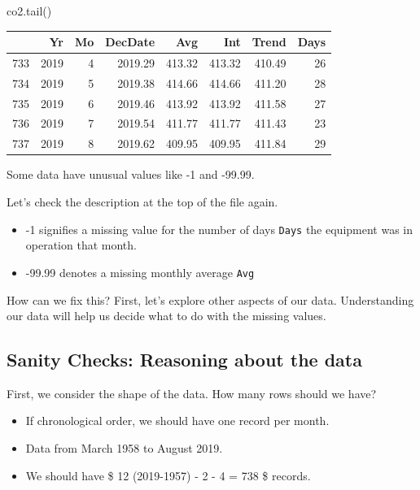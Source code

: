 \documentclass[
  letterpaper,
  DIV=11,
  numbers=noendperiod]{scrreprt}
\newenvironment{Shaded}{\begin{snugshade}}{\end{snugshade}}
\newcommand{\NormalTok}[1]{\textcolor[rgb]{0.00,0.23,0.31}{#1}}
\providecommand{\tightlist}{%
  \setlength{\itemsep}{0pt}\setlength{\parskip}{0pt}}\usepackage{longtable,booktabs,array}
\begin{document}
\begin{Shaded}
\begin{Highlighting}[]
\NormalTok{co2.tail()}
\end{Highlighting}
\end{Shaded}

\begin{tabular}{lrrrrrrr}
\toprule
{} &    Yr &  Mo &  DecDate &    Avg &    Int &  Trend &  Days \\
\midrule
733 &  2019 &   4 &  2019.29 & 413.32 & 413.32 & 410.49 &    26 \\
734 &  2019 &   5 &  2019.38 & 414.66 & 414.66 & 411.20 &    28 \\
735 &  2019 &   6 &  2019.46 & 413.92 & 413.92 & 411.58 &    27 \\
736 &  2019 &   7 &  2019.54 & 411.77 & 411.77 & 411.43 &    23 \\
737 &  2019 &   8 &  2019.62 & 409.95 & 409.95 & 411.84 &    29 \\
\bottomrule
\end{tabular}

Some data have unusual values like -1 and -99.99.

Let's check the description at the top of the file again.

\begin{itemize}
\tightlist
\item
  -1 signifies a missing value for the number of days \texttt{Days} the
  equipment was in operation that month.
\item
  -99.99 denotes a missing monthly average \texttt{Avg}
\end{itemize}

How can we fix this? First, let's explore other aspects of our data.
Understanding our data will help us decide what to do with the missing
values.

\hypertarget{sanity-checks-reasoning-about-the-data}{%
\subsection{Sanity Checks: Reasoning about the
data}\label{sanity-checks-reasoning-about-the-data}}

First, we consider the shape of the data. How many rows should we have?

\begin{itemize}
\tightlist
\item
  If chronological order, we should have one record per month.
\item
  Data from March 1958 to August 2019.
\item
  We should have \$ 12 \times (2019-1957) - 2 - 4 = 738 \$ records.
\end{itemize}
\end{document}
